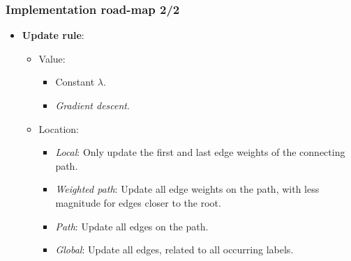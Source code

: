 \begin{frame}[noframenumbering]
\frametitle{Implementation road-map 2/2}
\begin{itemize}
	\item \textbf{Update rule}:
	\begin{itemize}
		\item Value:
		\begin{itemize}
			\item Constant $\lambda$.
			\item \textit{Gradient descent}.
		\end{itemize}
		\item Location:
		\begin{itemize}
			\item \textit{Local}: Only update the first and last edge weights of the connecting path.
			\item \textit{Weighted path}: Update all edge weights on the path, with less magnitude for edges closer to the root.
			\item \textit{Path}: Update all edges on the path.
			\item \textit{Global}: Update all edges, related to all occurring labels.
		\end{itemize}
	\end{itemize}		
\end{itemize}	
\end{frame}


